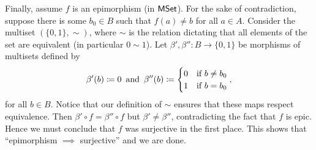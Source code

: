 \begin{solution}
	Finally, assume $f$ is an epimorphism (in $\textsf{MSet}$). For the sake of contradiction, suppose there is some $b_0 \in B$ such that $f(a)\neq b$ for all $a\in A$. Consider the multiset $(\{0,1\}, \sim)$, where $\sim$ is the relation dictating that all elements of the set are equivalent (in particular $0\sim 1$). Let $\beta',\beta'' \colon B \to \{0,1\}$ be morphisms of multisets defined by
	\[
	\beta'(b) \coloneqq 0 \,\textnormal{ and } \,\beta''(b)\coloneqq \begin{cases}
		0 & \textnormal{if } b\neq b_0\\
		1 & \textnormal{if } b = b_0
	\end{cases},
	\]
	for all $b\in B$. Notice that our definition of $\sim$ ensures that these maps respect equivalence. Then $\beta' \circ f = \beta'' \circ f$ but $\beta' \neq \beta''$, contradicting the fact that $f$ is epic. Hence we must conclude that $f$ was surjective in the first place. This shows that ``epimorphism $\implies$ surjective'' and we are done.
	
\end{solution}